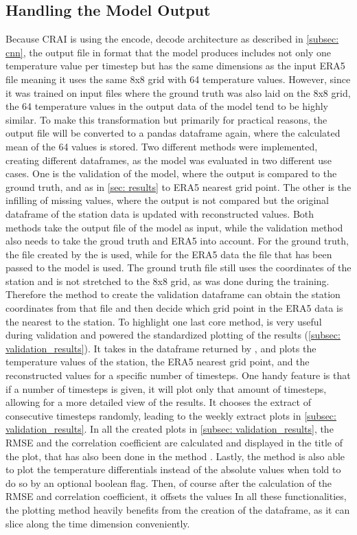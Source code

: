 \subsection{Handling the Model Output}
Because CRAI is using the encode, decode architecture as described in \autoref{subsec: cnn}, the output file in  format that the model produces includes not only one temperature value per timestep but has the same dimensions as the input ERA5 file meaning it uses the same 8x8 grid with 64 temperature values.
However, since it was trained on input files where the ground truth was also laid on the 8x8 grid, the 64 temperature values in the output data of the model tend to be highly similar.
To make this transformation but primarily for practical reasons, the output file will be converted to a pandas dataframe again, where the calculated mean of the 64 values is stored.
Two different methods were implemented, creating different dataframes, as the model was evaluated in two different use cases.
One is the validation of the model, where the output is compared to the ground truth, and as in \autoref{sec: results} to ERA5 nearest grid point.
The other is the infilling of missing values, where the output is not compared but the original dataframe of the station data is updated with reconstructed values.
Both methods take the output file of the model as input, while the validation method also needs to take the groud truth and ERA5 into account.
For the ground truth, the file created by the  is used, while for the ERA5 data the file that has been passed to the model is used.
The ground truth file still uses the coordinates of the station and is not stretched to the 8x8 grid, as was done during the training.
Therefore the method to create the validation dataframe  can obtain the station coordinates from that file and then decide which grid point in the ERA5 data is the nearest to the station.
To highlight one last core method,  is very useful during validation and powered the standardized plotting of the results (\autoref{subsec: validation_results}).
It takes in the dataframe returned by , and plots the temperature values of the station, the ERA5 nearest grid point, and the reconstructed values for a specific number of timesteps.
One handy feature is that if a number of timesteps is given, it will plot only that amount of timesteps, allowing for a more detailed view of the results.
It chooses the extract of  consecutive timesteps randomly, leading to the weekly extract plots in \autoref{subsec: validation_results}.
In all the created plots in \autoref{subsec: validation_results}, the RMSE and the correlation coefficient are calculated and displayed in the title of the plot,
that has also been done in the method .
Lastly, the method is also able to plot the temperature differentials instead of the absolute values when told to do so by an optional boolean flag.
Then, of course after the calculation of the RMSE and correlation coefficient, it offsets the values
In all these functionalities, the plotting method heavily benefits from the creation of the dataframe, as it can slice along the time dimension conveniently.